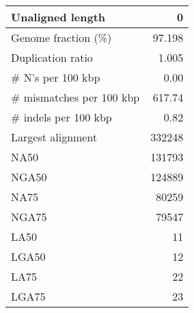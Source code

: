 \documentclass[12pt,a4paper]{article}
\begin{document}
\begin{table}[ht]
\begin{center}
\begin{tabular}{|l*{1}{|r}|}
Unaligned length & 0 \\ \hline
Genome fraction (\%) & 97.198 \\ \hline
Duplication ratio & 1.005 \\ \hline
\# N's per 100 kbp & 0.00 \\ \hline
\# mismatches per 100 kbp & 617.74 \\ \hline
\# indels per 100 kbp & 0.82 \\ \hline
Largest alignment & 332248 \\ \hline
NA50 & 131793 \\ \hline
NGA50 & 124889 \\ \hline
NA75 & 80259 \\ \hline
NGA75 & 79547 \\ \hline
LA50 & 11 \\ \hline
LGA50 & 12 \\ \hline
LA75 & 22 \\ \hline
LGA75 & 23 \\ \hline
\end{tabular}
\end{center}
\end{table}
\end{document}
